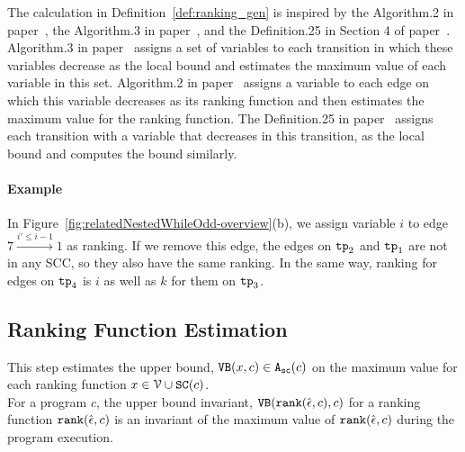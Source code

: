 The calculation in Definition~\ref{def:ranking_gen} is inspired by the Algorithm.2 in paper~\cite{SinnZV14},
 the Algorithm.3 in paper~\cite{ZulegerGSV11},
 and the Definition.25 in Section 4 of paper~\cite{SinnZV17}.
 Algorithm.3 in paper~\cite{ZulegerGSV11} assigns a set of variables to each transition in which these variables decrease as the local bound
 and estimates the maximum value of each variable in this set.
 Algorithm.2 in paper~\cite{SinnZV14} assigns a variable to each edge on which this variable decreases as its ranking function
 and then estimates the maximum value for the ranking function.
 The Definition.25 in paper~\cite{SinnZV17}
 assigns each transition with a variable that decreases in this transition, as the local bound and computes the bound similarly.

 

 \paragraph{Example}
 In Figure~\ref{fig:relatedNestedWhileOdd-overview}(b), we assign variable $i$ to edge $7 \xrightarrow{i' \leq i - 1} 1$ as ranking.
 If we remove this edge, the edges on $\mathtt{tp}_2$ and $\mathtt{tp}_1$ are not in any SCC, so they also have the same ranking.
In the same way, ranking for edges on $\mathtt{tp}_4$ is $i$ as well as $k$ for them on $\mathtt{tp}_3$.


 \subsection{Ranking Function Estimation}
 This step estimates the upper bound, ${\mathtt{VB}}(x, c) \in {\ensuremath{\mathtt{A_{sc}}}}(c)$
 on the maximum value for each ranking function $x \in \mathcal{V} \cup \mathtt{SC}(c)$.
 \\
 For a program $c$, the upper bound invariant,
 ${\mathtt{VB}}(\mathtt{rank}(\hat{\mathtt{\epsilon}{}}, c), c)$ for a ranking function $\mathtt{rank}(\hat{\mathtt{\epsilon}{}}, c)$ 
 is an invariant of the maximum value of $\mathtt{rank}(\hat{\mathtt{\epsilon}{}}, c)$ during the program execution.

